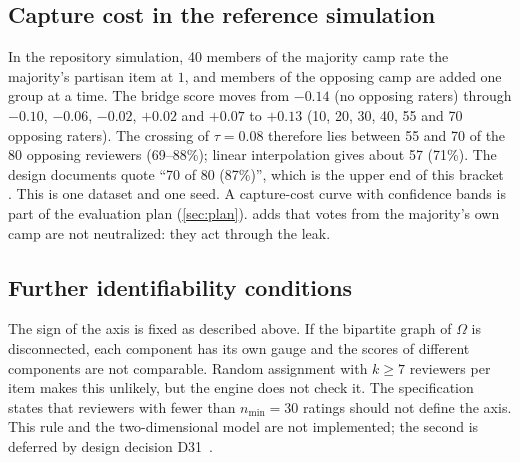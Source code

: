 \subsection{Capture cost in the reference simulation}

In the repository simulation, 40 members of the majority camp rate the majority's partisan
item at $1$, and members of the opposing camp are added one group at a time. The bridge score
moves from $-0.14$ (no opposing raters) through $-0.10$, $-0.06$, $-0.02$, $+0.02$ and $+0.07$ to
$+0.13$ (10, 20, 30, 40, 55 and 70 opposing raters). The crossing of $\tau=0.08$ therefore lies
between 55 and 70 of the 80 opposing reviewers (69--88\%); linear interpolation gives about 57
(71\%). The design documents quote ``70 of 80 (87\%)'', which is the upper end of this bracket
\empirical. This is one dataset and one seed. A capture-cost curve with confidence bands is
part of the evaluation plan (\cref{sec:plan}).  adds that votes from the
majority's own camp are not neutralized: they act through the leak.

\subsection{Further identifiability conditions}

The sign of the axis is fixed as described above. If the bipartite graph of $\Omega$ is
disconnected, each component has its own gauge and the scores of different components are not
comparable. Random assignment with $k\ge7$ reviewers per item makes this unlikely, but the
engine does not check it. The specification states that reviewers with fewer than $n_{\min}=30$
ratings should not define the axis. This rule and the two-dimensional model are not
implemented; the second is deferred by design decision D31~\cite{isegoria-repo}.
